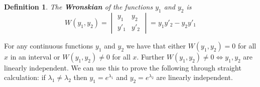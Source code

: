 \documentclass[letterpaper, 11pt, openany]{book}
\theoremstyle{mytheoremstyle}
\newtheorem{definition}{Definition}[section]
\theoremstyle{myexamplestyle}
\begin{document}
\begin{definition}\label{d:Wronskian}
    The \textbf{Wronskian} of the functions \(y_{1}\) and \(y_2\) is
    \[
        W(y_{1}, y_{2}) = \begin{vmatrix}
        y_{1} & y_{2}\\
        y'_{1} & y'_{2}
    \end{vmatrix} = y_{1} y'_{2} - y_{2} y'_{1}
    \]
\end{definition}

For any continuous functions \(y_{1}\) and \(y_2\) we have that either \(W(y_{1}, y_{2}) = 0\) for all \(x\) in an interval or \(W(y_{1}, y_{2}) \neq 0\) for all \(x\). Further \(W(y_{1}, y_{2}) \neq 0 \Leftrightarrow y_{1}, y_{2}\) are linearly independent. We can use this to prove the following through straight calculation: if \(\lambda_{1} \neq \lambda_{2}\) then \(y_{1} = e^{\lambda_{1}}\) and \(y_{2} = e^{\lambda_{2}}\) are linearly independent.
\end{document}
